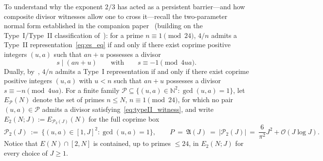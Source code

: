 \documentclass[11pt, a4paper]{article}
\theoremstyle{plain}
\theoremstyle{definition}
\newcommand{\N}{\mathbb{N}}
\begin{document}
To understand why the exponent $2/3$ has acted as a persistent barrier—and how composite divisor witnesses allow one to cross it—recall the two-parameter normal form established in the companion paper~\cite[Thm.~3.9]{dahan2026a} (building on the Type~I/Type~II classification of~\cite{elsholtz2013,pomerance2026}): for a prime $n\equiv1\pmod{24}$, $4/n$ admits a Type~II representation~\eqref{eq:es_eq} if and only if there exist coprime positive integers $(u,a)$ such that $an+u$ possesses a divisor
\begin{equation}\label{eq:typeII_witness}
s\mid(an+u)\qquad\text{with}\qquad s\equiv-1\pmod{4ua}.
\end{equation}
Dually, by~\cite[Thm.~3.11]{dahan2026a}, $4/n$ admits a Type~I representation if and only if there exist coprime positive integers $(u,a)$ with $u<n$ such that $an+u$ possesses a divisor $s\equiv-n\pmod{4ua}$. For a finite family $\mathcal{P}\subseteq\{(u,a)\in\N^{2}:\gcd(u,a)=1\}$, let $E_{\mathcal{P}}(N)$ denote the set of primes $n\le N$, $n\equiv1\pmod{24}$, for which no pair $(u,a)\in\mathcal{P}$ admits a divisor satisfying~\eqref{eq:typeII_witness}, and write $E_2(N;J):=E_{\mathcal{P}_2(J)}(N)$ for the full coprime box
\[
\mathcal{P}_2(J)\ :=\ \big\{(u,a)\in[1,J]^{2}:\gcd(u,a)=1\big\},\qquad P\ =\ \mathfrak{A}(J)\ =\ |\mathcal{P}_2(J)|\ =\ \frac{6}{\pi^{2}}J^{2}+\mathcal{O}(J\log J).
\]
Notice that $E(N)\cap[2,N]$ is contained, up to primes $\le 24$, in $E_2(N;J)$ for every choice of $J\ge 1$.
\end{document}
